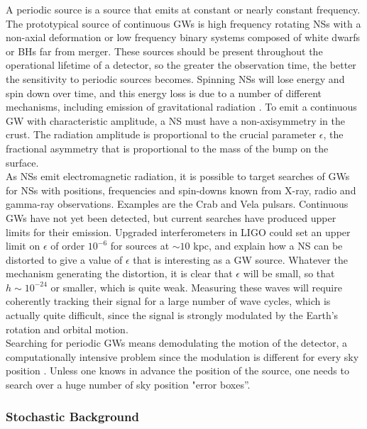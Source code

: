 \documentclass[binding=0.6cm, LaM]{sapthesis}
\begin{document}
	A periodic source is a source that emits at constant or nearly constant frequency.
	The prototypical source of continuous GWs is high frequency rotating NSs 
	with a non-axial deformation or low frequency binary systems 
	composed of white dwarfs or BHs far from merger. 
	These sources should be present throughout the operational lifetime of a detector, 
	so the greater the observation time, the better the sensitivity to periodic sources becomes. 
	Spinning NSs will lose energy and spin down over time, 
	and this energy loss is due to a number of different mechanisms, 
	including emission of gravitational radiation \cite{3}. 
	To emit a continuous GW with characteristic amplitude, 
	a NS must have a non-axisymmetry in the crust. 
	The radiation amplitude is proportional to the crucial parameter $\epsilon$, 
	the fractional asymmetry that is proportional to the mass of the bump on the surface. \\
	As NSs emit electromagnetic radiation, 
	it is possible to target searches of GWs for NSs with positions, 
	frequencies and spin-downs known from X-ray, radio and gamma-ray observations. 
	Examples are the Crab and Vela pulsars. 
	Continuous GWs have not yet been detected, 
	but current searches have produced upper limits for their emission. 
	Upgraded interferometers in LIGO could set an upper limit on  
	$\epsilon$ of order $10^{-6}$ for sources at $\sim10$ kpc, 
	and explain how a NS can be distorted to give a value of $\epsilon$ that is interesting as a GW source. 
	Whatever the mechanism generating the distortion, 
	it is clear that  $\epsilon$ will be small,
	so that $h \sim 10^{-24}$ or smaller, which is quite weak. 
	Measuring these waves will require
	coherently tracking their signal for a large number of wave cycles, 
	which is actually quite difficult, 
	since the signal is strongly modulated by the Earth’s rotation and orbital motion.\\
	Searching for periodic GWs means demodulating the motion of the detector, 
	a computationally intensive problem since the modulation is different for every sky position \cite{4}. 
	Unless one knows in advance the position of the source, 
	one needs to search over a huge number of sky position "error boxes”.

\subsubsection{Stochastic Background}
\end{document}
